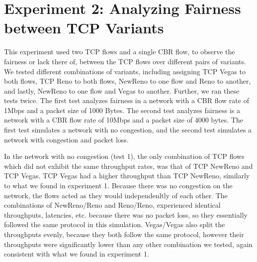 \section{Experiment 2: Analyzing Fairness between TCP Variants}

This experiment used two TCP flows and a single CBR flow, to observe the fairness or lack there of, between the TCP flows over different pairs of variants. We tested different combinations of variants, including assigning TCP Vegas to both flows, TCP Reno to both flows, NewReno to one flow and Reno to another, and lastly, NewReno to one flow and Vegas to another. Further, we ran these tests twice. The first test analyzes fairness in a network with a CBR flow rate of 1Mbps and a packet size of 1000 Bytes. The second test analyzes fairness is a network with a CBR flow rate of 10Mbps and a packet size of 4000 bytes. The first test simulates a network with no congestion, and the second test simulates a network with congestion and packet loss.

In the network with no congestion (test 1), the only combination of TCP flows which did not exhibit the same throughput rates, was that of TCP NewReno and TCP Vegas. TCP Vegas had a higher throughput than TCP NewReno, similarly to what we found in experiment 1. Because there was no congestion on the network, the flows acted as they would independenltly of each other. The combinations of NewReno/Reno and Reno/Reno, experienced identical throughputs, latencies, etc. because there was no packet loss, so they essentially followed the same protocol in this simulation. Vegas/Vegas also split the throughputs evenly, because they both follow the same protocol, however their throughputs were significantly lower than any other combination we tested, again consistent with what we found in experiment 1.

